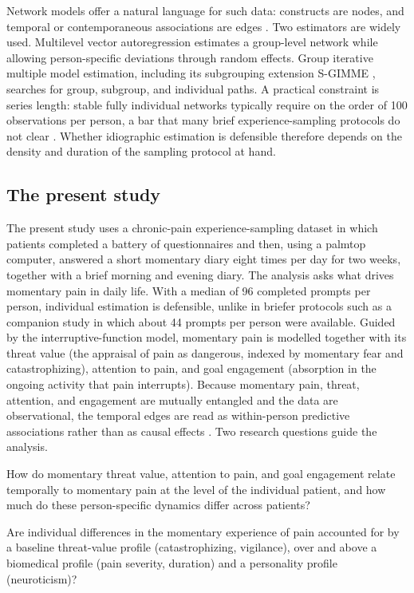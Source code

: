 \documentclass[11pt,a4paper]{article}
\begin{document}
Network models offer a natural language for such data: constructs are nodes, and temporal or
contemporaneous associations are edges \citep{borsboom2013network,bringmann2013network}. Two
estimators are widely used. Multilevel vector autoregression
\citep[mlVAR;][]{bringmann2013network,epskamp2018gaussian} estimates a group-level network while
allowing person-specific deviations through random effects. Group iterative multiple model
estimation, including its subgrouping extension S-GIMME
\citep{gates2012group,lane2019uncovering}, searches for group, subgroup, and individual paths. A
practical constraint is series length: stable fully individual networks typically require on the
order of 100 observations per person, a bar that many brief experience-sampling protocols do not
clear \citep{beltz2016bridging}. Whether idiographic estimation is defensible therefore depends on
the density and duration of the sampling protocol at hand.

\subsection{The present study}
The present study uses a chronic-pain experience-sampling dataset in which patients completed a
battery of questionnaires and then, using a palmtop computer, answered a short momentary diary
eight times per day for two weeks, together with a brief morning and evening diary. The analysis
asks what drives momentary pain in daily life. With a median of 96 completed prompts per person,
individual estimation is defensible, unlike in briefer protocols such as a companion study in
which about 44 prompts per person were available. Guided by the interruptive-function model,
momentary pain is modelled together with its threat value (the appraisal of pain as dangerous,
indexed by momentary fear and catastrophizing), attention to pain, and goal engagement
(absorption in the ongoing activity that pain interrupts). Because momentary pain, threat,
attention, and engagement are mutually entangled and the data are observational, the temporal
edges are read as within-person predictive associations rather than as causal effects
\citep{rohrer2018thinking}. Two research questions guide the analysis.

\begin{description}[leftmargin=2.2em,itemsep=2pt]
  \item[\textbf{RQ1.}] How do momentary threat value, attention to pain, and goal engagement
  relate temporally to momentary pain at the level of the individual patient, and how much do
  these person-specific dynamics differ across patients?
  \item[\textbf{RQ2.}] Are individual differences in the momentary experience of pain accounted
  for by a baseline threat-value profile (catastrophizing, vigilance), over and above a
  biomedical profile (pain severity, duration) and a personality profile (neuroticism)?
\end{description}
\end{document}
